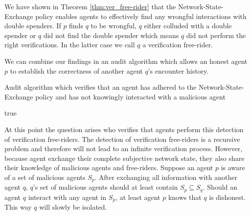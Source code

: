 We have shown in Theorem \ref{thm:ver_free-rider} that the Network-State-Exchange policy enables 
agents to effectively find any wrongful interactions with double spenders. If $p$ finds $q$ to
be wrongful, $q$ either colluded with a double spender or $q$ did not find the double spender which 
means $q$ did not perform the right verifications. In the latter case we call $q$ a verification 
free-rider.

We can combine our findings in an audit algorithm which allows an honest agent $p$ to establish the 
correctness of another agent $q$'s encounter history. 

\begin{algorithm}
\caption{Audit algorithm which verifies that an agent has adhered to the Network-State-Exchange 
policy and has not knowingly interacted with a malicious agent}\label{alg:verify_exchange}
\begin{algorithmic}[1]
\Else
{}
\EndIf
\EndIf
{}
\EndIf
{}
\EndIf
\EndIf
\EndFor
\Return true
\EndProcedure
\end{algorithmic}
\end{algorithm}

At this point the question arises who verifies that agents perform this detection of verification 
free-riders. The detection of verification free-riders is a recursive problem and therefore will not
lead to an infinite verification process. However, because agent exchange their complete subjective
network state, they also share their knowledge of malicious agents and free-riders. Suppose an agent
$p$ is aware of a set of malicious agents $S_p$. After exchanging all information with another agent
$q$, $q$'s set of malicious agents should at least contain $S_p \subseteq S_q$. Should an agent $q$ 
interact with any agent in $S_p$, at least agent $p$ knows that $q$ is dishonest. This way $q$ will 
slowly be isolated.

